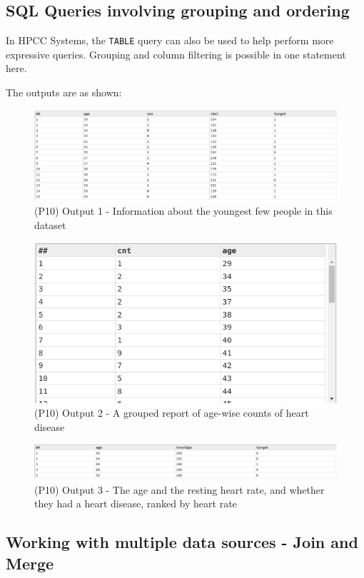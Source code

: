 \subsection{SQL Queries involving grouping and ordering}

In HPCC Systems, the \lstinline{TABLE} query can also be used to help perform more expressive queries. Grouping and column filtering is possible in one statement here.



The outputs are as shown:

\begin{figure}[h]
    \centering
    \includegraphics[width=.75\linewidth]{../output/63/1.png}
    \caption{(P10) Output 1 - Information about the youngest few people in this dataset}
\end{figure}

\begin{figure}[h]
    \centering
    \includegraphics[width=.5\linewidth]{../output/63/2}
    \caption{(P10) Output 2 - A grouped report of age-wise counts of heart disease}
\end{figure}
\begin{figure}[h]
    \centering
    \includegraphics[width=.75\linewidth]{../output/63/3}
    \caption{(P10) Output 3 - The age and the resting heart rate, and whether they had a heart disease, ranked by heart rate}
\end{figure}

\subsection{Working with multiple data sources - Join and Merge}

